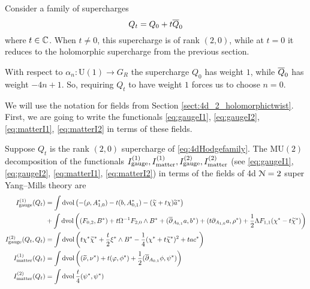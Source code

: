 \documentclass[10pt, oneside]{article}
\newcommand{\MU}{\mathrm{MU}}
\renewcommand{\U}{\mathrm{U}}
\begin{document}
Consider a family of supercharges
\begin{equation} 
\label{eq:4dHodgefamily}
Q_t = Q_0 + t \Bar{Q}_0
\end{equation}
where $t \in \CC$. When $t \ne 0$, this supercharge is of rank $(2,0)$, while at $t = 0$ it reduces to the holomorphic supercharge from the previous section.

\begin{remark}
With respect to $\alpha_n\colon \U(1)\rightarrow G_R$ the supercharge $Q_0$ has weight $1$, while $\Bar{Q}_0$ has weight $-4n+1$. So, requiring $Q_t$ to have weight $1$ forces us to choose $n=0$.
\end{remark}

We will use the notation for fields from Section \ref{sect:4d_2_holomorphictwist}. First, we are going to write the functionals \eqref{eq:gaugeI1}, \eqref{eq:gaugeI2}, \eqref{eq:matterI1}, \eqref{eq:matterI2} in terms of these fields.

\begin{prop}
Suppose $Q_t$ is the rank $(2,0)$ supercharge of \ref{eq:4dHodgefamily}.
The $\MU(2)$ decomposition of the functionals $I_{\rm gauge}^{(1)}, I^{(1)}_{\rm matter}, I^{(2)}_{\rm gauge}, I^{(2)}_{\rm matter}$ (see \eqref{eq:gaugeI1},  \eqref{eq:gaugeI2}, \eqref{eq:matterI1}, \eqref{eq:matterI2}) in terms of the fields of 4d $\cN=2$ super Yang--Mills theory are
\begin{align*}
I_{\rm gauge}^{(1)}(Q_t) &= \int \dvol\left(-(\rho, A_{1, 0}^*) - t(b, A_{0, 1}^*) - (\wt \chi + t\chi)\wt a^*\right) \\
&+ \int\dvol\left((F_{0, 2}, B^*) + t\Omega^{-1} F_{2, 0}\wedge B^* + (\ol\dd_{A_{0, 1}}a, b^*) + (t\dd_{A_{1, 0}} a, \rho^*) + \frac{1}{2}\Lambda F_{1, 1}(\chi^* - t\wt\chi^*)\right) \\
I^{(2)}_{\rm gauge} (Q_t, Q_t) &= \int \dvol \left(t\chi^*\wt \chi^* + \frac{t}{2} \xi^*\wedge B^* -\frac{1}{4}(\chi^* + t\wt\chi^*)^2 + t a c^*\right) \\
I_{\rm matter}^{(1)}(Q_t) &= \int \dvol \left((\Tilde{\nu}, \nu^*) + t (\varphi, \phi^*) + \frac{1}{2} (\dbar_{A_{0,1}} \phi, \psi^*) \right) \\
I_{\rm matter}^{(2)}(Q_t) &= \int \dvol \frac t4  (\psi^*, \psi^*)
\end{align*}
\end{prop}
\end{document}

